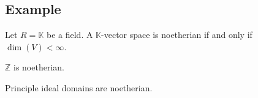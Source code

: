 \documentclass[12pt]{book}
\begin{document}
\begin{spacing}{1.3}
\subsection*{Example} %
\titleformat{\subsection}{\normalfont\normalsize\bfseries}{}{0em}{#1 \thesubsection}
\begin{compactenum}
\item Let $R=\mathbb{K}$ be a field. A $\mathbb{K}$-vector space is noetherian if and only if $\dim(V)<\infty$. 
\item $\mathbb{Z}$ is noetherian.
\item Principle ideal domains are noetherian.
\end{compactenum}


\end{spacing}
\end{document}
